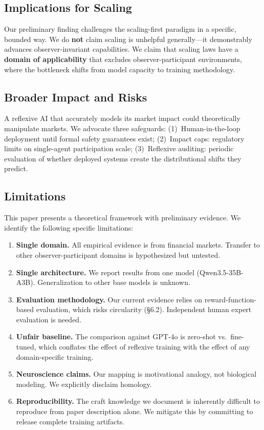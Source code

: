 \documentclass[11pt,a4paper]{article}
\begin{document}
\subsection{Implications for Scaling}
Our preliminary finding challenges the scaling-first paradigm in a specific, bounded way. We do \textbf{not} claim scaling is unhelpful generally---it demonstrably advances observer-invariant capabilities. We claim that scaling laws have a \textbf{domain of applicability} that excludes observer-participant environments, where the bottleneck shifts from model capacity to training methodology.

\subsection{Broader Impact and Risks}
A reflexive AI that accurately models its market impact could theoretically manipulate markets. We advocate three safeguards: (1)~Human-in-the-loop deployment until formal safety guarantees exist; (2)~Impact caps: regulatory limits on single-agent participation scale; (3)~Reflexive auditing: periodic evaluation of whether deployed systems create the distributional shifts they predict.

\subsection{Limitations}
This paper presents a theoretical framework with preliminary evidence. We identify the following specific limitations:

\begin{enumerate}[leftmargin=*]
\item \textbf{Single domain.} All empirical evidence is from financial markets. Transfer to other observer-participant domains is hypothesized but untested.
\item \textbf{Single architecture.} We report results from one model (Qwen3.5-35B-A3B). Generalization to other base models is unknown.
\item \textbf{Evaluation methodology.} Our current evidence relies on reward-function-based evaluation, which risks circularity (\S6.2). Independent human expert evaluation is needed.
\item \textbf{Unfair baseline.} The comparison against GPT-4o is zero-shot vs.\ fine-tuned, which conflates the effect of reflexive training with the effect of any domain-specific training.
\item \textbf{Neuroscience claims.} Our mapping is motivational analogy, not biological modeling. We explicitly disclaim homology.
\item \textbf{Reproducibility.} The craft knowledge we document is inherently difficult to reproduce from paper description alone. We mitigate this by committing to release complete training artifacts.
\end{enumerate}
\end{document}

